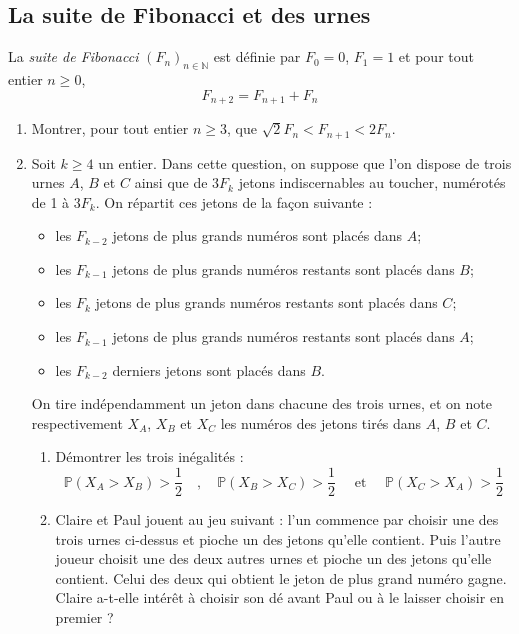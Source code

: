 \documentclass[landscape,twocolumn,leqno,a4paper,10pt]{report} %
\newcommand\n{\noindent}
\newcommand\q{\quad}
\renewcommand{\geq}{\geqslant}
\newcommand{\Prob}{\mathbb{P}}
\begin{document}
\subsection{La suite de Fibonacci et des urnes}

\n La \textit{suite de Fibonacci} $\left(F_{n}\right)_{n \in \mathbb{N}}$ est définie par $F_{0}=0$, $F_{1}=1$ et pour tout entier $n \geq 0$,
$$F_{n+2}=F_{n+1}+F_{n}$$

\begin{enumerate}
	\item Montrer, pour tout entier $n \geq 3$, que $\sqrt{2} F_{n}<F_{n+1}<2 F_{n}$.
	\item Soit $k \geq 4$ un entier. Dans cette question, on suppose que l'on dispose de trois urnes $A$, $B$ et $C$ ainsi que de $3 F_{k}$ jetons indiscernables au toucher, numérotés de 1 à $3 F_{k}$. On répartit ces jetons de la façon suivante :
	\begin{itemize}
		\item les $F_{k-2}$ jetons de plus grands numéros sont placés dans $A$;
		\item les $F_{k-1}$ jetons de plus grands numéros restants sont placés dans $B$;
		\item les $F_{k}$ jetons de plus grands numéros restants sont placés dans $C$;
		\item les $F_{k-1}$ jetons de plus grands numéros restants sont placés dans $A$;
		\item les $F_{k-2}$ derniers jetons sont placés dans $B$.
	\end{itemize}
	\newpage
	On tire indépendamment un jeton dans chacune des trois urnes, et on note respectivement $X_{A}$, $X_{B}$ et $X_{C}$ les numéros des jetons tirés dans $A$, $B$ et $C$.
	\begin{enumerate}
		\item Démontrer les trois inégalités :
		$$\Prob\left(X_{A}>X_{B}\right)>\frac{1}{2} \q , \q \Prob\left(X_{B}>X_{C}\right)>\frac{1}{2} \q\text { et } \q \Prob\left(X_{C}>X_{A}\right)>\frac{1}{2}$$
		\item Claire et Paul jouent au jeu suivant : l'un commence par choisir une des trois urnes ci-dessus et pioche un des jetons qu'elle contient. Puis l'autre joueur choisit une des deux autres urnes et pioche un des jetons qu'elle contient. Celui des deux qui obtient le jeton de plus grand numéro gagne.\\
		Claire a-t-elle intérêt à choisir son dé avant Paul ou à le laisser choisir en premier ?
	\end{enumerate}
\end{enumerate}
\end{document}
